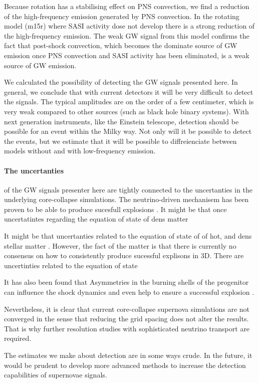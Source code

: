 Because rotation has a stabilising effect on PNS convection, we find a reduction of the high-frequency emission generated
by PNS convection. In the rotating model (m15r) where SASI activity dose not develop there is a strong reduction of the high-frequency
emission. The weak GW signal from this model confirms the fact that post-shock convection, which becomes the dominate source of GW emission once
PNS convection and SASI activity has been eliminated, is a weak source of GW emission.

We calculated the possibility of detecting the GW signals presented here. In general, we conclude that 
with current detectors it will be very difficult to detect the signals. The typical amplitudes are
on the order of a few centimeter, which is very weak compared to other sources (such as black hole binary systems).
With next generation instruments, like the Einstein telescope, detection should be possible for an event within the 
Milky way. Not only will it be possible to detect the events, but we estimate that it will be possible to
diffreienciate between models without and with low-frequency emission.


\paragraph{The uncertanties}
of the GW signals presenter here are tightly connected to the uncertanties in the underlying
core-collapse simulations. The neutrino-driven mechanisem has been proven to be able
to produce sucesfull explosions \citep{melson_15a,melson_15b,lentz_15,suma_models}.
It might be that once uncertatintes regarding the equation of state of dens matter \cite{fischer_14,lattimer_16}


It might be that uncertanties related to the equation of state of of hot, and dens stellar matter \cite{fischer_14, lattimer_16}.
However, the fact of the matter is that
there is currently no consensus on how to consistently produce
sucessful explisons in 3D. There are uncertinties related to the 
equation of state 


It has also been found that Asymmetries in the burning shells of the progenitor can 
influence the shock dynamics and even help to ensure a
successful explosion \citep{burrows_96,fryer_04,arnett_11,couch_13,mueller_15a}.


Nevertheless, it is clear that current
core-collapse supernova simulations are not converged in the sense that reducing the
grid spacing does not alter the results. That is why further resolution studies with
sophisticated neutrino transport are required.







 The estimates we make about detection are
in some ways crude. In the future, it would be prudent to develop more advanced methods to increase the 
detection capabilities of supernovae signals.
